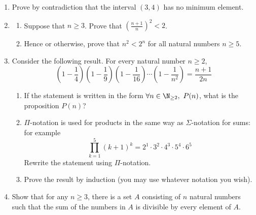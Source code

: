 \begin{exercises}{}{}

\begin{enumerate}
  \item Prove by contradiction that the interval $(3,4)$ has no minimum element.
  
  \item\begin{enumerate}
    \item Suppose that $n\ge 3$. Prove that $\left(\frac{n+1}n\right)^2<2$.
    \item Hence or otherwise, prove that $n^2<2^n$ for all natural numbers $n\ge 5$.
  \end{enumerate}

  \item Consider the following result. For every natural number $n\ge 2$,
	\[\left(1-\frac{1}{4}\right) \left(1-\frac{1}{9}\right) \left(1-\frac{1}{16}\right) \cdots \left(1-\frac{1}{n^2}\right) = \frac{n+1}{2n}\]
  \begin{enumerate}
    \item If the statement is written in the form $\forall n\in\N_{\ge 2},\ P(n)$, what is the proposition $P(n)$?
    \item $\Pi$-notation is used for products in the same way as $\Sigma$-notation for sums: for example
    \[\prod_{k=1}^5(k+1)^k=2^1\cdot 3^2\cdot 4^3\cdot 5^4\cdot 6^5\]
    Rewrite the statement using $\Pi$-notation.
    \item Prove the result by induction (you may use whatever notation you wish).
  \end{enumerate}
	
	
	
  \item Show that for any $n \geq 3$, there is a set $A$ consisting of $n$ natural numbers such that the sum of the numbers in $A$ is divisible by every element of $A$.
	

\end{enumerate}
\end{exercises}
